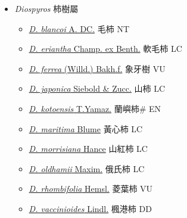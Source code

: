 
  \begin{itemize}
 \item[] \textit{Diospyros} 柿樹屬
                    
  \begin{itemize}
        \item[] \href{http://www.theplantlist.org/tpl1.1/search?q=Diospyros+blancoi}{\textit{D. blancoi} A. DC.}     毛柿 NT
        \item[] \href{http://www.theplantlist.org/tpl1.1/search?q=Diospyros+eriantha}{\textit{D. eriantha} Champ. ex Benth.}   軟毛柿 LC
        \item[] \href{http://www.theplantlist.org/tpl1.1/search?q=Diospyros+ferrea}{\textit{D. ferrea} (Willd.) Bakh.f.}   象牙樹 VU
        \item[] \href{http://www.theplantlist.org/tpl1.1/search?q=Diospyros+japonica}{\textit{D. japonica} Siebold \& Zucc.}   山柿 LC
        \item[] \href{http://www.theplantlist.org/tpl1.1/search?q=Diospyros+kotoensis}{\textit{D. kotoensis} T.Yamaz.}   蘭嶼柿\# EN
        \item[] \href{http://www.theplantlist.org/tpl1.1/search?q=Diospyros+maritima}{\textit{D. maritima} Blume}   黃心柿 LC
        \item[] \href{http://www.theplantlist.org/tpl1.1/search?q=Diospyros+morrisiana}{\textit{D. morrisiana} Hance}   山紅柿 LC
        \item[] \href{http://www.theplantlist.org/tpl1.1/search?q=Diospyros+oldhamii}{\textit{D. oldhamii} Maxim.}   俄氏柿 LC
        \item[] \href{http://www.theplantlist.org/tpl1.1/search?q=Diospyros+rhombifolia}{\textit{D. rhombifolia} Hemsl.}   菱葉柿 VU
        \item[] \href{http://www.theplantlist.org/tpl1.1/search?q=Diospyros+vaccinioides}{\textit{D. vaccinioides} Lindl.}   楓港柿 DD
  \end{itemize}
  \end{itemize}
